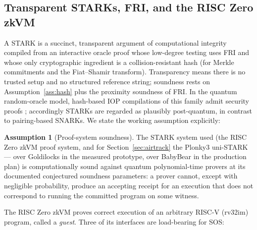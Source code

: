 \documentclass[11pt]{article}
\theoremstyle{plain}
\theoremstyle{definition}
\newtheorem{assumption}{Assumption}
\theoremstyle{remark}
\begin{document}
\subsection{Transparent STARKs, FRI, and the RISC Zero zkVM}
\label{sec:starks}

A STARK \cite{starks2018} is a succinct, transparent argument of computational
integrity compiled from an interactive oracle proof \cite{bcs2016} whose
low-degree testing uses FRI \cite{fri2018} and whose only cryptographic
ingredient is a collision-resistant hash (for Merkle commitments and the
Fiat--Shamir transform). Transparency means there is no trusted setup and no
structured reference string; soundness rests on Assumption~\ref{ass:hash} plus
the proximity soundness of FRI. In the quantum random-oracle model,
hash-based IOP compilations of this family admit security proofs
\cite{cms2019}; accordingly STARKs are regarded as plausibly post-quantum, in
contrast to pairing-based SNARKs. We state the working assumption explicitly:

\begin{assumption}[Proof-system soundness]
\label{ass:stark}
The STARK system used (the RISC Zero zkVM \cite{risc0} proof system, and for
Section~\ref{sec:airtrack} the Plonky3 \cite{plonky3} uni-STARK --- over
Goldilocks in the measured prototype, over BabyBear in the production plan)
is computationally sound against quantum polynomial-time provers at its
documented conjectured soundness parameters: a prover cannot, except with
negligible probability, produce an accepting receipt for an execution that
does not correspond to running the committed program on some witness.
\end{assumption}

The RISC Zero zkVM proves correct execution of an arbitrary RISC-V
(rv32im) program, called a \emph{guest}. Three of its interfaces are
load-bearing for SOS:
\end{document}
